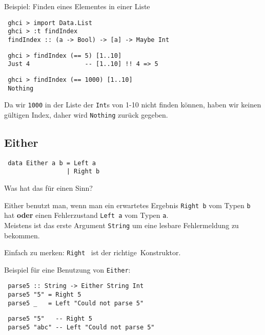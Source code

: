 \documentclass{beamer}
\begin{document}
\begin{frame}[fragile]
 Beispiel: Finden eines Elementes in einer Liste \bigskip
 
 \pause
 \begin{verbatim}
 ghci > import Data.List
 ghci > :t findIndex
 findIndex :: (a -> Bool) -> [a] -> Maybe Int
 \end{verbatim}
 
 \pause
 
 \begin{verbatim}
 ghci > findIndex (== 5) [1..10]
 Just 4               -- [1..10] !! 4 => 5
 \end{verbatim}
 
 \pause
 
 \begin{verbatim}
 ghci > findIndex (== 1000) [1..10]
 Nothing
 \end{verbatim}
 \pause
 Da wir \texttt{1000} in der Liste der \texttt{Int}s von 1-10 nicht finden können, haben wir keinen gültigen Index, daher wird \texttt{Nothing} zurück gegeben.
\end{frame}

\subsection{Either}

\begin{frame}[fragile]
 \begin{verbatim}
 data Either a b = Left a
                 | Right b
 \end{verbatim}
 \pause
 Was hat das für einen Sinn?\bigskip
 
 \pause
 Either benutzt man, wenn man ein erwartetes Ergebnis \texttt{Right b} vom Typen \texttt{b} hat \textbf{oder} einen Fehlerzustand \texttt{Left a} vom Typen \texttt{a}.\\
 Meistens ist das erste Argument \texttt{String} um eine lesbare Fehlermeldung zu bekommen.
 
 \pause
 \bigskip
 
 Einfach zu merken: \texttt{Right} \ ist der \glqq richtige\grqq \ Konstruktor.
\end{frame}

\begin{frame}[fragile]
 Beispiel für eine Benutzung von \texttt{Either}: \bigskip
 
 \begin{verbatim}
 parse5 :: String -> Either String Int
 parse5 "5" = Right 5
 parse5 _   = Left "Could not parse 5"
 \end{verbatim}
 
 \pause 
 
 \begin{verbatim}
 parse5 "5"   -- Right 5
 parse5 "abc" -- Left "Could not parse 5"
 \end{verbatim}
\end{frame}
\end{document}
